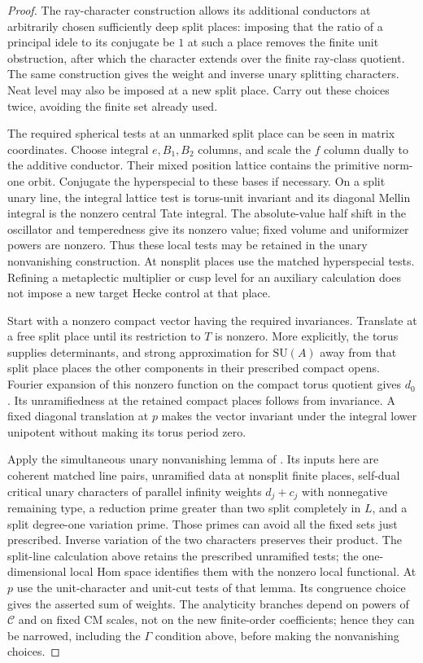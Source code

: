 \begin{proof}
The ray-character construction allows its additional conductors at
arbitrarily chosen sufficiently deep split places: imposing that the
ratio of a principal idele to its conjugate be $1$ at such a place
removes the finite unit obstruction, after which the character extends
over the finite ray-class quotient.  The same construction gives the
weight and inverse unary splitting characters.  Neat level may also
be imposed at a new split place.  Carry out these choices twice,
avoiding the finite set already used.

The required spherical tests at an unmarked split place can be seen
in matrix coordinates.  Choose integral $e,B_1,B_2$ columns, and
scale the $f$ column dually to the additive conductor.  Their mixed
position lattice contains the primitive norm-one orbit.  Conjugate
the hyperspecial to these bases if necessary.  On a split unary
line, the integral lattice test is torus-unit invariant and its
diagonal Mellin integral is the nonzero central Tate integral.
The absolute-value half shift in the oscillator and temperedness
give its nonzero value; fixed volume and uniformizer powers are
nonzero.  Thus these local tests may be retained in the unary
nonvanishing construction.  At nonsplit places use the matched
hyperspecial tests.  Refining a metaplectic multiplier or cusp level
for an auxiliary calculation does not impose a new target Hecke
control at that place.

Start with a nonzero compact vector having the required invariances.
Translate at a free split place until its restriction to $T$ is
nonzero.  More explicitly, the torus supplies determinants, and
strong approximation for $\mathrm{SU}(A)$ away from that split place
places the other components in their prescribed compact opens.
Fourier expansion of this nonzero function on the compact torus
quotient gives $d_0$.  Its unramifiedness at the retained compact
places follows from invariance.  A fixed diagonal translation at
$p$ makes the vector invariant under the integral lower unipotent
without making its torus period zero.

Apply the simultaneous unary nonvanishing lemma of
\cite[Lemma 6.2]{C}.
Its inputs here are coherent matched line pairs, unramified data at
nonsplit finite places, self-dual critical unary characters of
parallel infinity weights $d_j+c_j$ with nonnegative remaining type,
a reduction prime greater than two split completely in $L$, and a
split degree-one variation prime.  Those primes can avoid all the
fixed sets just prescribed.  Inverse variation of the two characters
preserves their product.  The split-line calculation above retains
the prescribed unramified tests; the one-dimensional local Hom space
identifies them with the nonzero local functional.  At $p$ use the
unit-character and unit-cut tests of that lemma.  Its congruence
choice gives the asserted sum of weights.  The analyticity branches
depend on powers of $\mathcal C$ and on fixed CM scales, not on the
new finite-order coefficients; hence they can be narrowed, including
the $\Gamma$ condition above, before making the nonvanishing choices.
\end{proof}

